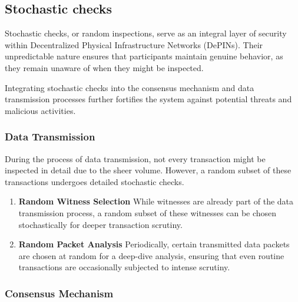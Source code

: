 \documentclass{article}
\begin{document}
\subsection{Stochastic checks}

Stochastic checks, or random inspections, serve as an integral layer of security within Decentralized Physical Infrastructure Networks (DePINs). Their unpredictable nature ensures that participants maintain genuine behavior, as they remain unaware of when they might be inspected. 

Integrating stochastic checks into the consensus mechanism and data transmission processes further fortifies the system against potential threats and malicious activities.

\subsubsection{Data Transmission}
During the process of data transmission, not every transaction might be inspected in detail due to the sheer volume. However, a random subset of these transactions undergoes detailed stochastic checks.
\begin{enumerate}

\item \textbf{Random Witness Selection} While witnesses are already part of the data transmission process, a random subset of these witnesses can be chosen stochastically for deeper transaction scrutiny.

\item \textbf{Random Packet Analysis} Periodically, certain transmitted data packets are chosen at random for a deep-dive analysis, ensuring that even routine transactions are occasionally subjected to intense scrutiny.
\end{enumerate}


\subsubsection{Consensus Mechanism}
\end{document}
